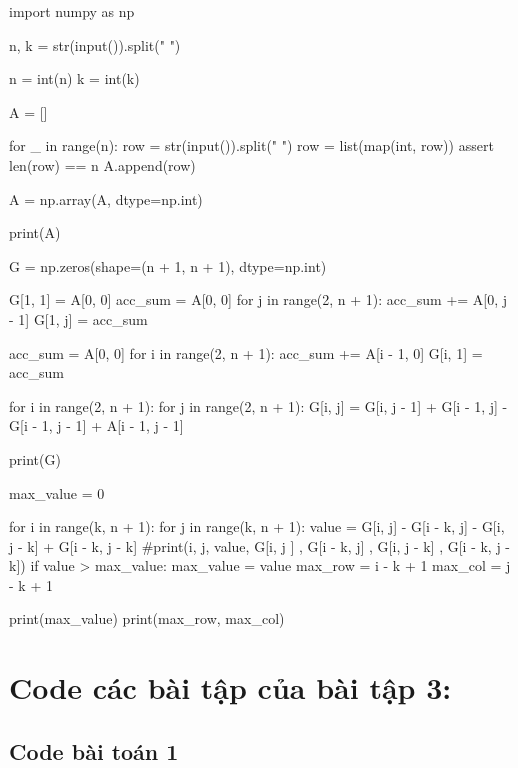 \documentclass[14pt, a4paper]{article}
\theoremstyle{sltheorem}
\theoremstyle{soltheorem}
\begin{document}
    \begin{python}
import numpy as np
        
n, k = str(input()).split(" ")
                    
n = int(n)
k = int(k)
                    
A = []
                    
for _ in range(n):
    row = str(input()).split(" ")
    row = list(map(int, row))
    assert len(row) == n
    A.append(row)
                    
A = np.array(A, dtype=np.int)
                    
print(A)
                    
G = np.zeros(shape=(n + 1, n + 1), dtype=np.int)
                    
G[1, 1] = A[0, 0]
acc_sum = A[0, 0]
for j in range(2, n + 1):
    acc_sum += A[0, j - 1]
    G[1, j] = acc_sum
                    
acc_sum = A[0, 0]
for i in range(2, n + 1):
    acc_sum += A[i - 1, 0]
    G[i, 1] = acc_sum
                    
for i in range(2, n + 1):
    for j in range(2, n + 1):
        G[i, j] = G[i, j - 1] + G[i - 1, j] - G[i - 1, j - 1] + A[i - 1, j - 1]
                    
                    
print(G)
                    
max_value = 0
                    
for i in range(k, n + 1):
    for j in range(k, n + 1):
        value = G[i, j] - G[i - k, j] - G[i, j - k] + G[i - k, j - k]
        #print(i, j, value, G[i, j ] , G[i - k, j] , G[i, j - k] , G[i - k, j - k])
        if value > max_value:
            max_value = value
            max_row = i - k + 1
            max_col = j - k + 1
                    
print(max_value)
print(max_row, max_col)
        \end{python}

\section{Code các bài tập của bài tập 3:}

\subsection{Code bài toán 1} \label{code-1-ex-3}
\end{document}
